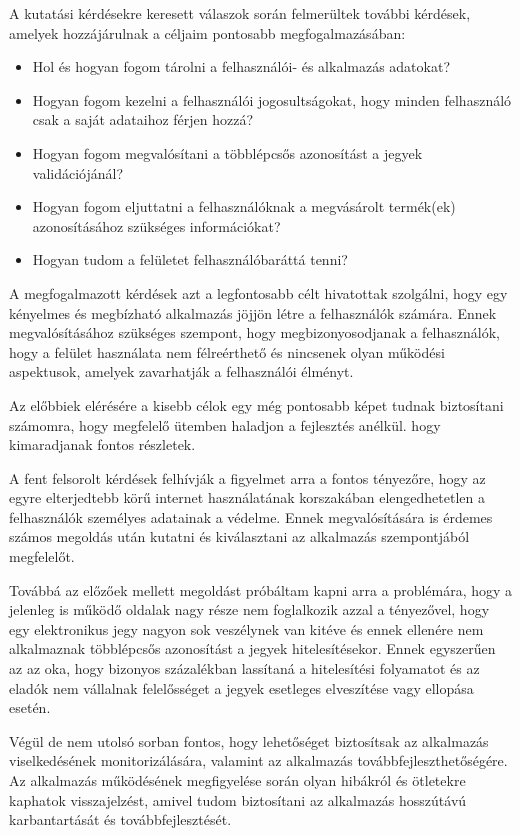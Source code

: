 A kutatási kérdésekre keresett válaszok során felmerültek további kérdések, amelyek hozzájárulnak a céljaim pontosabb megfogalmazásában:
\begin{itemize}
	\item Hol és hogyan fogom tárolni a felhasználói- és alkalmazás adatokat?
	\item Hogyan fogom kezelni a felhasználói jogosultságokat, hogy minden felhasználó csak a saját adataihoz férjen hozzá?
	\item Hogyan fogom megvalósítani a többlépcsős azonosítást a jegyek validációjánál?
	\item Hogyan fogom eljuttatni a felhasználóknak a megvásárolt termék(ek) azonosításához szükséges információkat? 
	\item Hogyan tudom a felületet felhasználóbaráttá tenni?
\end{itemize}

A megfogalmazott kérdések azt a legfontosabb célt hivatottak szolgálni, hogy egy kényelmes és megbízható alkalmazás jöjjön létre a felhasználók számára. Ennek megvalósításához szükséges szempont, hogy megbizonyosodjanak a felhasználók, hogy a felület használata nem félreérthető és nincsenek olyan működési aspektusok, amelyek zavarhatják a felhasználói élményt.

Az előbbiek elérésére a kisebb célok egy még pontosabb képet tudnak biztosítani számomra, hogy megfelelő ütemben haladjon a fejlesztés anélkül. hogy kimaradjanak fontos részletek.

A fent felsorolt kérdések felhívják a figyelmet arra a fontos tényezőre, hogy az egyre elterjedtebb körű internet használatának korszakában elengedhetetlen a felhasználók személyes adatainak a védelme. Ennek megvalósítására is érdemes számos megoldás után kutatni és kiválasztani az alkalmazás szempontjából megfelelőt.

Továbbá az előzőek mellett megoldást próbáltam kapni arra a problémára, hogy a jelenleg is működő oldalak nagy része nem foglalkozik azzal a tényezővel, hogy egy elektronikus jegy nagyon sok veszélynek van kitéve és ennek ellenére nem alkalmaznak többlépcsős azonosítást a jegyek hitelesítésekor. Ennek egyszerűen az az oka, hogy bizonyos százalékban lassítaná a hitelesítési folyamatot és az eladók nem vállalnak felelősséget a jegyek esetleges elveszítése vagy ellopása esetén.

Végül de nem utolsó sorban fontos, hogy lehetőséget biztosítsak az alkalmazás viselkedésének monitorizálására, valamint az alkalmazás továbbfejleszthetőségére. Az alkalmazás működésének megfigyelése során olyan hibákról és ötletekre kaphatok visszajelzést, amivel tudom biztosítani az alkalmazás hosszútávú karbantartását és továbbfejlesztését.